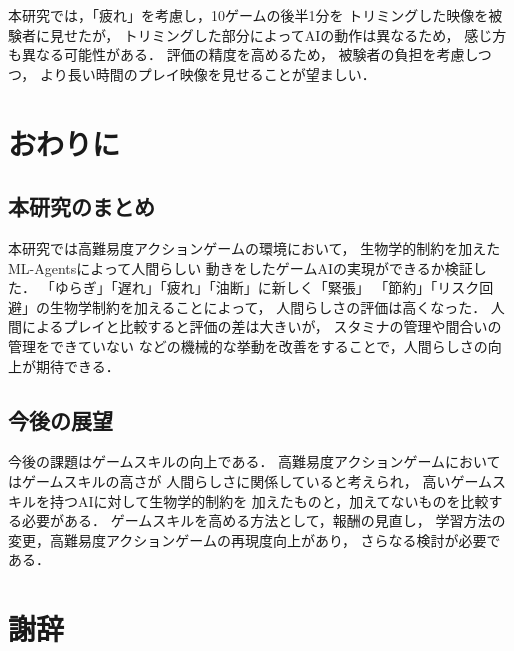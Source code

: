 \documentclass[a4paper,12pt,oneside,openany,titlepage]{jreport}
\begin{document}

本研究では，「疲れ」を考慮し，10ゲームの後半1分を
トリミングした映像を被験者に見せたが，
トリミングした部分によってAIの動作は異なるため，
感じ方も異なる可能性がある．
評価の精度を高めるため，
被験者の負担を考慮しつつ，
より長い時間のプレイ映像を見せることが望ましい．


\chapter{おわりに}
\thispagestyle{fancy}
\lhead{\leftmark}
\rhead{\thepage}
\renewcommand{\headrulewidth}{1pt}

\section{本研究のまとめ}
本研究では高難易度アクションゲームの環境において，
生物学的制約を加えたML-Agentsによって人間らしい
動きをしたゲームAIの実現ができるか検証した．
「ゆらぎ」「遅れ」「疲れ」「油断」に新しく「緊張」
「節約」「リスク回避」の生物学制約を加えることによって，
人間らしさの評価は高くなった．
人間によるプレイと比較すると評価の差は大きいが，
スタミナの管理や間合いの管理をできていない
などの機械的な挙動を改善をすることで，人間らしさの向上が期待できる．

\section{今後の展望}
今後の課題はゲームスキルの向上である．
高難易度アクションゲームにおいてはゲームスキルの高さが
人間らしさに関係していると考えられ，
高いゲームスキルを持つAIに対して生物学的制約を
加えたものと，加えてないものを比較する必要がある．
ゲームスキルを高める方法として，報酬の見直し，
学習方法の変更，高難易度アクションゲームの再現度向上があり，
さらなる検討が必要である．
 


\newpage


\chapter*{謝辞}
\thispagestyle{plain}
\lhead{\leftmark}
\rhead{\thepage}
\renewcommand{\headrulewidth}{1pt}
\end{document}
